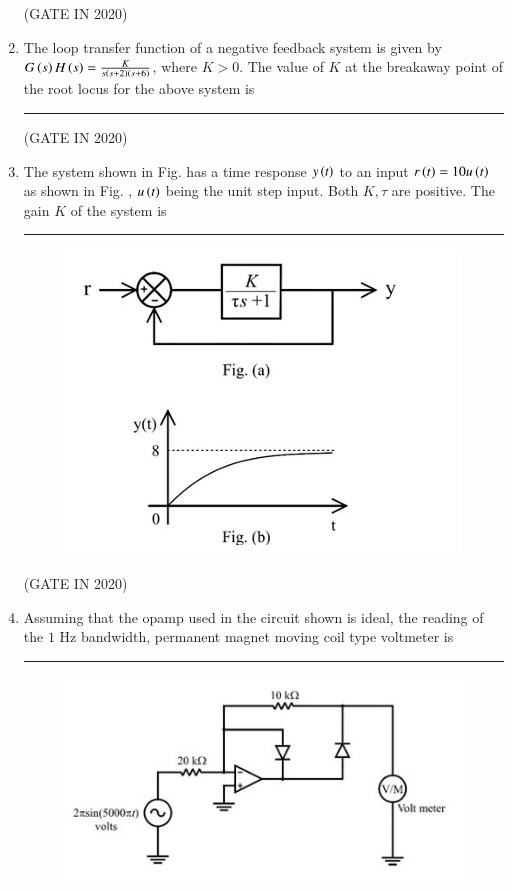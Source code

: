 \documentclass[journal,12pt,onecolumn]{IEEEtran}
\theoremstyle{remark}
\begin{document}
\begin{enumerate}
\hfill{(GATE IN 2020)}

\item The loop transfer function of a negative feedback system is given by $G\left(s\right)H\left(s\right) = \frac{K}{s\left(s+2\right)\left(s+6\right)}$, where $K > 0$. The value of $K$ at the breakaway point of the root locus for the above system  is \rule{2cm}{0.4pt}

\hfill{(GATE IN 2020)}

\item The system shown in Fig.  has a time response $y\left(t\right)$ to an input $r\left(t\right) = 10 u\left(t\right)$ as shown in Fig. , $u\left(t\right)$ being the unit step input. Both $K, \tau$ are positive. The gain $K$ of the system is \rule{2cm}{0.4pt}
\begin{figure}[H]
\centering
\includegraphics[width=0.8\columnwidth]{figs/q16.jpg}
\caption*{}
\label{fig:q16}
\end{figure}

\hfill{(GATE IN 2020)}

\item Assuming that the opamp used in the circuit shown is ideal, the reading of the $1$ Hz bandwidth, permanent magnet moving coil  type voltmeter  is \rule{2cm}{0.4pt}
\begin{figure}[H]
\centering
\includegraphics[width=0.6\columnwidth]{figs/q17.jpg}
\caption*{}
\label{fig:q17}
\end{figure}


\end{enumerate}
\end{document}
